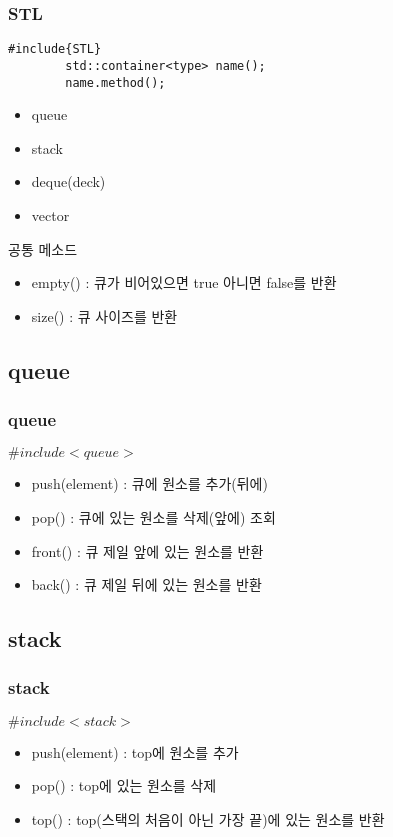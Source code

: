 \documentclass[10pt]{beamer}
\begin{document}
\begin{frame}[fragile]
    \frametitle{STL}
    
    \begin{lstlisting}[style = CppStyle]
        #include{STL}
        std::container<type> name();
        name.method();
    \end{lstlisting}

    \begin{itemize}
        \item queue
        \item stack
        \item deque(deck)
        \item vector
    \end{itemize}
    공통 메소드
    \begin{itemize}
        \item empty() : 큐가 비어있으면 true 아니면 false를 반환
        \item size() : 큐 사이즈를 반환
    \end{itemize}
\end{frame}

\subsection{queue}

\begin{frame}
    \frametitle{queue}
    $\#include<queue>$
    \begin{itemize}
        \item push(element) : 큐에 원소를 추가(뒤에)
        \item pop() : 큐에 있는 원소를 삭제(앞에) 조회
        \item front() : 큐 제일 앞에 있는 원소를 반환
        \item back() : 큐 제일 뒤에 있는 원소를 반환
    \end{itemize}
\end{frame}



\subsection{stack}


\begin{frame}
    \frametitle{stack}
    $\#include<stack>$
    \begin{itemize}
        \item push(element) : top에 원소를 추가
        \item pop() : top에 있는 원소를 삭제
        \item top() : top(스택의 처음이 아닌 가장 끝)에 있는 원소를 반환
    \end{itemize}
\end{frame}
\end{document}
